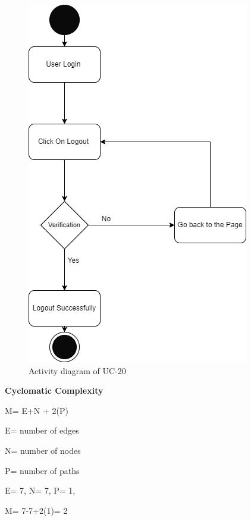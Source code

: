 \begin{figure}[H]
    \centering
    \includegraphics[scale=0.7]{./diagrams/Activity Diagram/ad-20.png}
    \caption{Activity diagram of UC-20}
    \label{fig:act-20}

\end{figure}


\textbf{Cyclomatic Complexity}

M= E+N + 2(P)

E= number of edges

N= number of nodes

P= number of paths

E= 7,   N= 7,   P= 1,

M= 7-7+2(1)= 2
